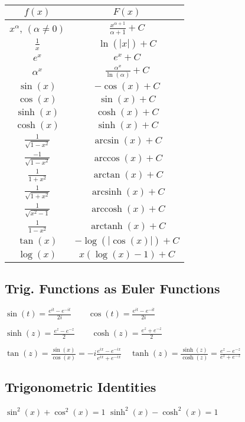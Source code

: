 \documentclass[a4paper,11pt]{extarticle}
\newcommand{\abs}[1]{\left\lvert #1 \right\rvert}
\DeclareMathOperator{\arcsinh}{arcsinh}
\DeclareMathOperator{\arccosh}{arccosh}
\DeclareMathOperator{\arctanh}{arctanh}
\begin{document}
\begin{multicols*}{2}
\begin{center}
\begin{tabular}{cc}
\toprule
$f(x)$ & $F(x)$ \\
\midrule
$x^\alpha$, $(\alpha\neq 0)$ & $\frac{x^{\alpha +1}}{\alpha +1}+C$
\\
$\frac{1}{x}$ & $\ln(\abs{x})+C$
\\
\hline
$e^x$ & $e^x + C$
\\
$\alpha^x$ & $\frac{\alpha^x}{\ln(\alpha)}+C$
\\
\hline
$\sin(x)$ & $-\cos(x)+C$
\\
$\cos(x)$ & $\sin(x)+C$
\\
\hline
$\sinh(x)$ & $\cosh(x) + C$
\\
$\cosh(x)$ & $\sinh(x) + C$
\\
\hline
$\frac{1}{\sqrt{1-x^2}}$ & $\arcsin(x)+C$
\\
$\frac{-1}{\sqrt{1-x^2}}$ & $\arccos(x)+C$
\\
$\frac{1}{1+x^2}$ & $\arctan(x)+C$
\\
\hline
$\frac{1}{\sqrt{1 + x^2}}$ & $\arcsinh(x)+C$
\\
$\frac{1}{\sqrt{x^2-1}}$ & $\arccosh(x)+C$
\\
$\frac{1}{1-x^2}$ & $\arctanh(x)+C$
\\
\hline
$\tan(x)$ & $-\log(\abs{\cos(x)})+C$\\
\hline
$\log(x)$ & $x(\log(x)-1)+C$\\
\bottomrule
\end{tabular}
\end{center}

\subsection{Trig. Functions as Euler Functions}
$
\sin(t) = \frac{e^{it}-e^{-it}}{2i}
\qquad
\cos(t) = \frac{e^{it}-e^{-it}}{2i}
$

$
\sinh(z) = \frac{e^z-e^{-z}}{2}
\qquad
\cosh(z) = \frac{e^z+e^{-z}}{2}
$

$
\tan(z) = \frac{\sin(x)}{\cos(x)}
= -i\frac{e^{ix} - e^{-ix}}{e^{ix} + e^{-ix}}
\quad
\tanh(z) = \frac{\sinh(z)}{\cosh(z)} = \frac{e^z-e^{-z}}{e^z+e^{-z}}
$

\subsection{Trigonometric Identities}
$
\sin^2(x) + \cos^2(x) = 1
$
\qquad
$
\sinh^2(x) - \cosh^2(x) = 1
$


\end{multicols*}
\end{document}
